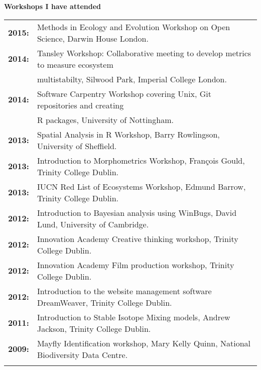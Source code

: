 \documentclass[10pt,a4paper]{article}
\begin{document}
\raggedright\textbf{Workshops I have attended}\\
\begin{tabular}{ll}
\textbf{2015:} & Methods in Ecology and Evolution Workshop on Open Science, Darwin House London.\\
\textbf{2014:} & Tansley Workshop: Collaborative meeting to develop metrics to measure ecosystem\\
&multistabilty, Silwood Park, Imperial College London.\\
\textbf{2014:} & Software Carpentry Workshop covering Unix, Git repositories and creating\\
&R packages, University of Nottingham.\\
\textbf{2013:} & Spatial Analysis in R Workshop, Barry Rowlingson, University of Sheffield.\\
\textbf{2013:} & Introduction to Morphometrics Workshop, François Gould, Trinity College Dublin.\\
\textbf{2013:} & IUCN Red List of Ecosystems Workshop, Edmund Barrow, Trinity College Dublin.\\
\textbf{2012:} & Introduction to Bayesian analysis using WinBugs, David Lund, University of Cambridge.\\
\textbf{2012:} & Innovation Academy Creative thinking workshop, Trinity College Dublin.\\
\textbf{2012:} & Innovation Academy Film production workshop, Trinity College Dublin.\\
\textbf{2012:} & Introduction to the website management software DreamWeaver, Trinity College Dublin.\\
\textbf{2011:} & Introduction to Stable Isotope Mixing models, Andrew Jackson, Trinity College Dublin.\\
\textbf{2009:} & Mayfly Identification workshop, Mary Kelly Quinn, National Biodiversity Data Centre.\\
&\\
\end{tabular}






\bigskip
\end{document}
